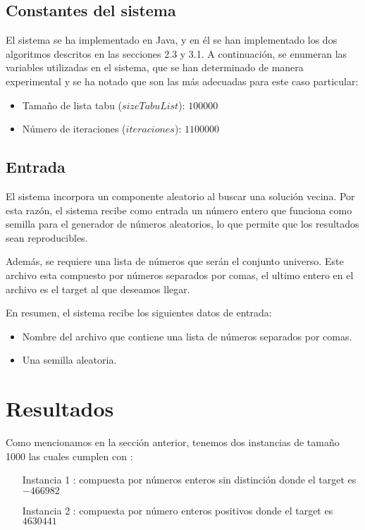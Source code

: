 \documentclass[spanish,12pt,letterpaper]{article}
\begin{document}
	\subsection{Constantes del sistema}
	El sistema se ha implementado en Java, y en él se han implementado los dos algoritmos descritos en las secciones 2.3 y 3.1. A continuación, se enumeran las variables utilizadas en el sistema, que se han determinado de manera experimental y se ha notado que son las más adecuadas para este caso particular:
	
	\begin{itemize}
		\item Tamaño de lista tabu ($sizeTabuList$): $100000$
		\item Número de iteraciones ($iteraciones$): $1100000$
	\end{itemize}
	\subsection{Entrada}
	El sistema incorpora un componente aleatorio al buscar una solución vecina. Por esta razón, el sistema recibe como entrada un número entero que funciona como semilla para el generador de números aleatorios, lo que permite que los resultados sean reproducibles.
	
	Además, se requiere una lista de números que serán el conjunto universo. Este archivo esta compuesto por números separados por comas, el ultimo entero en el archivo es el target al que deseamos llegar. 
	
	En resumen, el sistema recibe los siguientes datos de entrada:
	\begin{itemize}
		\item Nombre del archivo que contiene una lista de números separados por comas.
		\item Una semilla aleatoria.
	\end{itemize}
	\section{Resultados}
	Como mencionamos en la sección anterior, tenemos dos instancias de tamaño 1000 las cuales cumplen con :
	\begin{enumerate}
		\item[Instancia 1] : compuesta por números enteros sin distinción  donde el target es $-466982$
		\item[Instancia 2]: compuesta por número enteros positivos donde el target es $4630441$
	\end{enumerate}
	
\end{document}

